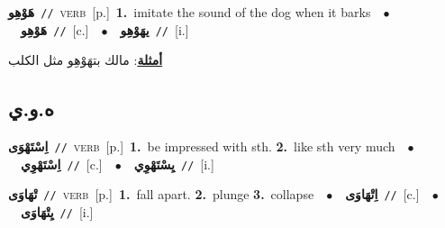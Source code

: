 \documentclass[10pt,a4paper,twoside]{article} %
\begin{document}
\begin{multicols}{2}
{\setlength\topsep{0pt}\textbf{\foreignlanguage{arabic}{هَوْهِو}}\ {\color{gray}\texttt{//}\color{black}}\ \textsc{verb}\ [p.]\ \textbf{1.}~imitate the sound of the dog when it barks\ \ $\bullet$\ \ \setlength\topsep{0pt}\textbf{\foreignlanguage{arabic}{هَوْهِو}}\ {\color{gray}\texttt{//}\color{black}}\ [c.]\ \ $\bullet$\ \ \setlength\topsep{0pt}\textbf{\foreignlanguage{arabic}{يهَوْهِو}}\ {\color{gray}\texttt{//}\color{black}}\ [i.]\  \begin{flushright}\color{gray}\foreignlanguage{arabic}{\textbf{\underline{\foreignlanguage{arabic}{أمثلة}}}: مالك بتهَوْهِو مثل الكلب}\end{flushright}\color{black}} \vspace{2mm}

\vspace{-3mm}
\subsection*{\color{blue}\foreignlanguage{arabic}{ه.و.ي}\color{blue}{}} 

{\setlength\topsep{0pt}\textbf{\foreignlanguage{arabic}{اِسْتَهْوَى}}\ {\color{gray}\texttt{//}\color{black}}\ \textsc{verb}\ [p.]\ \textbf{1.}~be impressed with sth.  \textbf{2.}~like sth very much\ \ $\bullet$\ \ \setlength\topsep{0pt}\textbf{\foreignlanguage{arabic}{اِسْتَهْوِي}}\ {\color{gray}\texttt{//}\color{black}}\ [c.]\ \ $\bullet$\ \ \setlength\topsep{0pt}\textbf{\foreignlanguage{arabic}{يِسْتَهْوِي}}\ {\color{gray}\texttt{//}\color{black}}\ [i.]\ } \vspace{2mm}

{\setlength\topsep{0pt}\textbf{\foreignlanguage{arabic}{تْهَاوَى}}\ {\color{gray}\texttt{//}\color{black}}\ \textsc{verb}\ [p.]\ \textbf{1.}~fall apart.  \textbf{2.}~plunge  \textbf{3.}~collapse\ \ $\bullet$\ \ \setlength\topsep{0pt}\textbf{\foreignlanguage{arabic}{اِتْهَاوَى}}\ {\color{gray}\texttt{//}\color{black}}\ [c.]\ \ $\bullet$\ \ \setlength\topsep{0pt}\textbf{\foreignlanguage{arabic}{يِتْهَاوَى}}\ {\color{gray}\texttt{//}\color{black}}\ [i.]\ } \vspace{2mm}


\end{multicols}
\end{document}
